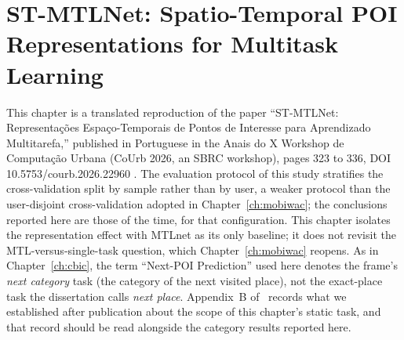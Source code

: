 \chapter[ST-MTLNet: Spatio-Temporal POI Representations]{ST-MTLNet: Spatio-Temporal POI Representations for Multitask Learning}
\label{ch:courb}

\begin{chapterpreface}
This chapter is a translated reproduction of the paper ``ST-MTLNet: Representações Espaço-Temporais de Pontos de Interesse para Aprendizado Multitarefa,'' published in Portuguese in the Anais do X Workshop de Computação Urbana (CoUrb 2026, an SBRC workshop), pages 323 to 336, DOI 10.5753/courb.2026.22960 \cite{paiva2026stmtlnet}. The evaluation protocol of this study stratifies the cross-validation split by sample rather than by user, a weaker protocol than the user-disjoint cross-validation adopted in Chapter~\ref{ch:mobiwac}; the conclusions reported here are those of the time, for that configuration. This chapter isolates the representation effect with MTLnet as its only baseline; it does not revisit the MTL-versus-single-task question, which Chapter~\ref{ch:mobiwac} reopens. As in Chapter~\ref{ch:cbic}, the term ``Next-POI Prediction'' used here denotes the frame's \emph{next category} task (the category of the next visited place), not the exact-place task the dissertation calls \emph{next place}. Appendix~B of \extravolume\ records what we established after publication about the scope of this chapter's static task, and that record should be read alongside the category results reported here.
\end{chapterpreface}

